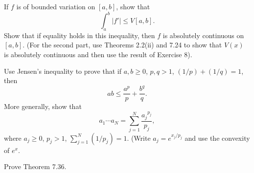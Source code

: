 \begin{problem}
  If \(f\) is of bounded variation on \([a,b]\), show that
  \[
    \int_a^b|f'|\leq V[a,b].
  \]
  Show that if equality holds in this inequality, then \(f\) is absolutely
  continuous on \([a,b]\). (For the second part, use Theorems 2.2(ii) and
  7.24 to show that \(V(x)\) is absolutely continuous and then use the
  result of Exercise 8).
\end{problem}
\begin{solution}
\end{solution}

\begin{problem}
  Use Jensen's inequality to prove that if \(a,b\geq 0\), \(p,q>1\),
  \((1/p)+(1/q)=1\), then
  \[
    ab\leq\frac{a^p}{p}+\frac{b^q}{q}.
  \]
  More generally, show that
  \[
    a_1\dotsm a_N=\sum_{j=1}^N\frac{{a_j}^{p_j}}{p_j},
  \]
  where \(a_j\geq 0\), \(p_j>1\), \(\sum_{j=1}^N(1/p_j)=1\). (Write
  \(a_j=e^{x_j/p_j}\) and use the convexity of \(e^x\).
\end{problem}
\begin{solution}
\end{solution}

\begin{problem}
  Prove Theorem 7.36.
\end{problem}

